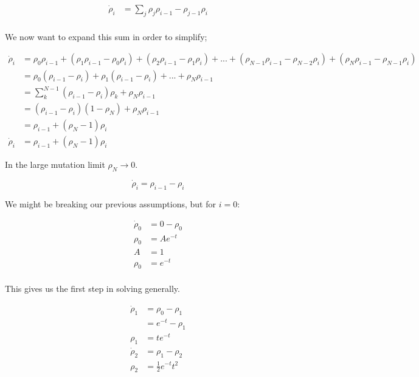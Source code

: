\documentclass[a4paper]{article}
\begin{document}
\begin{align*}
\dot{\rho} _i & = \sum _j \rho _j \rho _{i-1} - \rho _{j-1} \rho _{i} \\
\end{align*}

We now want to expand this sum in order to simplify; 

\begin{align*}
\dot{\rho} _i & = \rho _0 \rho _{i - 1} + ( \rho _1 \rho _{i-1} - \rho _0 \rho _i ) + ( \rho _2 \rho _{i-1} - \rho _1 \rho _i ) + ... + ( \rho _{N - 1} \rho _{i-1} - \rho _{N-2} \rho _i ) + ( \rho _N \rho _{i-1} - \rho _{N-1} \rho _i ) \\
& = \rho _0 ( \rho _{i-1} - \rho _i ) + \rho _1 ( \rho _{i-1} - \rho _i ) + ... + \rho _N \rho _{i-1} \\
& = \sum _k ^{N -1} ( \rho _{i-1} - \rho _i ) \rho _k + \rho _N \rho _{i-1} \\
& = ( \rho _{i-1} - \rho _i ) ( 1 - \rho _N ) + \rho _N \rho _{i-1} \\
& = \rho _{i-1} + ( \rho _N - 1) \rho _i \\
\dot{\rho} _i & = \rho _{i-1} + (\rho _N - 1 ) \rho _i
\end{align*} 

In the large mutation limit $\rho _N \rightarrow 0 $.

\begin{equation}
\dot{\rho} _i  = \rho _{i-1} - \rho _i 
\end{equation} 

We might be breaking our previous assumptions, but for $i=0$:

\begin{align*}
\dot{\rho} _0 & = 0 - \rho _0 \\
\rho _0 & = A e^{-t} \\
A & = 1 \\
\rho _0 & = e^{-t} \\
\end{align*}

This gives us the first step in solving generally. 

\begin{align*}
\dot{\rho} _1 & = \rho _0 - \rho _1 \\
& = e^{-t} - \rho _1 \\
\rho _1 & = t e ^{-t} \\
\dot{\rho} _2 & = \rho _1 - \rho _2 \\
\rho _2 & = \frac{1}{2} e^{-t} t ^2 \\
\end{align*}
\end{document}

